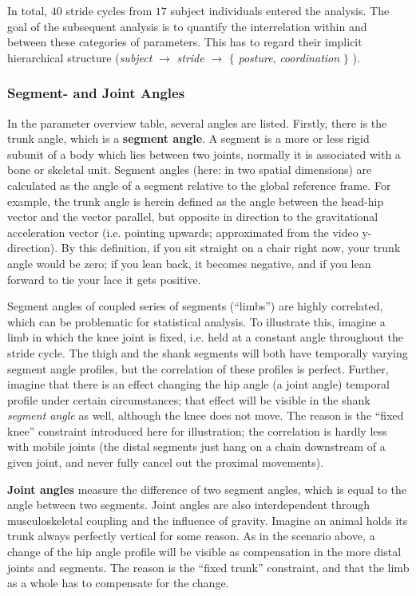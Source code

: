 In total, \(40\) stride cycles from \(17\) subject individuals entered the analysis.
The goal of the subsequent analysis is to quantify the interrelation within and between these categories of parameters.
This has to regard their implicit hierarchical structure (\emph{subject} \(\rightarrow\) \emph{stride} \(\rightarrow\) \(\lbrace\) \emph{posture}, \emph{coordination} \(\rbrace\) ).


\subsubsection{Segment- and Joint Angles}
\label{sec:orgd5b5698}
In the parameter overview table, several angles are listed.
Firstly, there is the trunk angle, which is a \textbf{segment angle}.
A segment is a more or less rigid subunit of a body which lies between two joints, normally it is associated with a bone or skeletal unit.
Segment angles (here: in two spatial dimensions) are calculated as the angle of a segment relative to the global reference frame.
For example, the trunk angle is herein defined as the angle between the head-hip vector and the vector parallel, but opposite in direction to the gravitational acceleration vector (i.e. pointing upwards; approximated from the video y-direction).
By this definition, if you sit straight on a chair right now, your trunk angle would be zero; if you lean back, it becomes negative, and if you lean forward to tie your lace it gets positive.

Segment angles of coupled series of segments (``limbs'') are highly correlated, which can be problematic for statistical analysis.
To illustrate this, imagine a limb in which the knee joint is fixed, i.e. held at a constant angle throughout the stride cycle.
The thigh and the shank segments will both have temporally varying segment angle profiles, but the correlation of these profiles is perfect.
Further, imagine that there is an effect changing the hip angle (a joint angle) temporal profile under certain circumstances; that effect will be visible in the shank \textit{segment angle} as well, although the knee does not move.
The reason is the ``fixed knee'' constraint introduced here for illustration; the correlation is hardly less with mobile joints (the distal segments just hang on a chain downstream of a given joint, and never fully cancel out the proximal movements).


\textbf{Joint angles} measure the difference of two segment angles, which is equal to the angle between two segments.
Joint angles are also interdependent through musculoskeletal coupling and the influence of gravity.
Imagine an animal holds its trunk always perfectly vertical for some reason.
As in the scenario above, a change of the hip angle profile will be visible as compensation in the more distal joints and segments.
The reason is the ``fixed trunk'' constraint, and that the limb as a whole has to compensate for the change.

